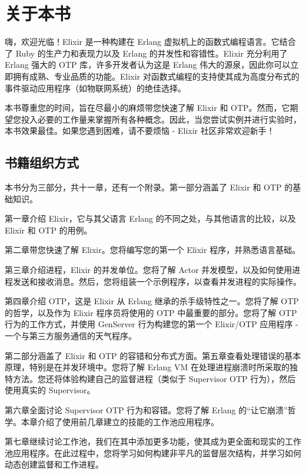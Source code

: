 \chapter*{关于本书}\label{about}

嗨，欢迎光临！Elixir 是一种构建在 Erlang
虚拟机上的函数式编程语言。它结合了 Ruby 的生产力和表现力以及 Erlang
的并发性和容错性。Elixir 充分利用了 Erlang 强大的 OTP
库，许多开发者认为这是 Erlang
伟大的源泉，因此你可以立即拥有成熟、专业品质的功能。Elixir
对函数式编程的支持使其成为高度分布式的事件驱动应用程序（如物联网系统）的绝佳选择。

本书尊重您的时间，旨在尽最小的麻烦带您快速了解 Elixir 和
OTP。然而，它期望您投入必要的工作量来掌握所有各种概念。因此，当您尝试实例并进行实验时，本书效果最佳。如果您遇到困难，请不要烦恼
- Elixir 社区非常欢迎新手！

\section*{书籍组织方式}

本书分为三部分，共十一章，还有一个附录。第一部分涵盖了 Elixir 和 OTP
的基础知识。

第一章介绍 Elixir，它与其父语言 Erlang
的不同之处，与其他语言的比较，以及 Elixir 和 OTP 的用例。

第二章带您快速了解 Elixir。您将编写您的第一个 Elixir
程序，并熟悉语言基础。

第三章介绍进程，Elixir 的并发单位。您将了解 Actor
并发模型，以及如何使用进程发送和接收消息。然后，您将组装一个示例程序，以查看并发进程的实际操作。

第四章介绍 OTP，这是 Elixir 从 Erlang 继承的杀手级特性之一。您将了解 OTP
的哲学，以及作为 Elixir 程序员将使用的 OTP 中最重要的部分。您将了解 OTP
行为的工作方式，并使用 GenServer 行为构建您的第一个 Elixir/OTP 应用程序
- 一个与第三方服务通信的天气程序。

第二部分涵盖了 Elixir 和 OTP
的容错和分布式方面。第五章查看处理错误的基本原理，特别是在并发环境中。您将了解
Erlang VM
在处理进程崩溃时所采取的独特方法。您还将体验构建自己的监督进程（类似于
Supervisor OTP 行为），然后使用真实的 Supervisor。

第六章全面讨论 Supervisor OTP 行为和容错。您将了解 Erlang
的``让它崩溃''哲学。本章介绍了使用前几章建立的技能的工作池应用程序。

第七章继续讨论工作池，我们在其中添加更多功能，使其成为更全面和现实的工作池应用程序。在此过程中，您将学习如何构建非平凡的监督层次结构，并学习如何动态创建监督和工作进程。

